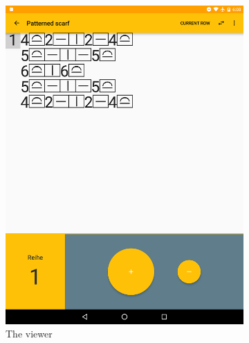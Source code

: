 \begin{figure}[H]
	\centering
	\begin{subfigure}[b]{0.5\textwidth}
	  \centering
	    \includegraphics[width=0.95\linewidth]{images/viewer_row_h900.png}
	    \caption[The viewer \protect{}]{The viewer}
	  \label{fig:viewer}
	\end{subfigure}
	\begin{subfigure}[b]{0.5\textwidth}
	  \centering

\end{subfigure}
\end{figure}
